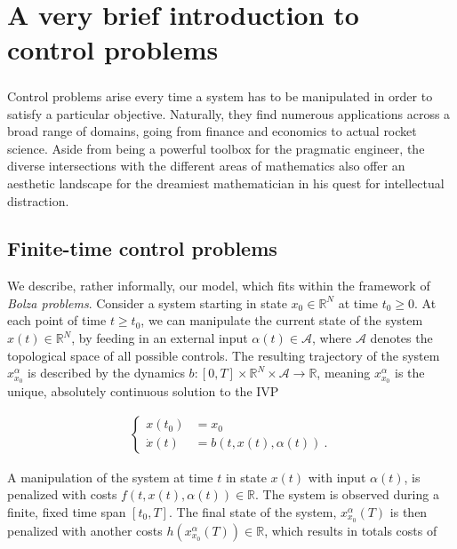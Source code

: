 \chapter{A very brief introduction to control problems} 

	\paragraph{}
	Control problems arise every time a system has to be manipulated in order to satisfy a particular objective. Naturally, they find numerous applications across a broad range of domains, going from finance and economics to actual rocket science. Aside from being a powerful toolbox for the pragmatic engineer, the diverse intersections with the different areas of mathematics also offer an aesthetic landscape for the dreamiest mathematician in his quest for intellectual distraction. 
	
	\section{Finite-time control problems}
	
	We describe, rather informally, our model, which fits within the framework of \emph{Bolza problems}. Consider a system starting in state $ x_0 \in \mathbb{R}^N $ at time $ t_0 \geq 0 $. At each point of time $ t \geq t_0 $, we can manipulate the current state of the system $ x(t) \in \mathbb{R}^N $, by feeding in an external input $ \alpha(t) \in \mathcal{A} $, where $ \mathcal{A} $ denotes the topological space of all possible controls. The resulting trajectory of the system $ x^{\alpha}_{x_0} $ is described by the dynamics $ b : \left[ 0 , T \right] \times \mathbb{R}^N \times \mathcal{A} \to \mathbb{R} $, meaning $ x^{\alpha}_{x_0} $ is the unique, absolutely continuous solution to the IVP
	
	\begin{align*}
	\begin{cases}
	x(t_0) &= x_0 \\
	\dot{x}(t) &= b(t, x(t), \alpha(t)) \ .
	\end{cases}
	\end{align*}
	
	A manipulation of the system at time $ t $ in state $ x(t) $ with input $ \alpha(t) $, is penalized with costs $ f(t, x(t), \alpha(t)) \in \mathbb{R} $. The system is observed during a finite, fixed time span $ \left[t_0, T \right] $. The final state of the system, $ x^{\alpha}_{x_0}(T) $ is then penalized with another costs $ h(x^{\alpha}_{x_0}(T)) \in \mathbb{R} $, which results in totals costs of
	
